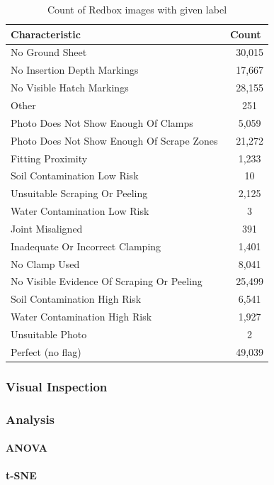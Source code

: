 \documentclass[a4paper,11pt]{article}
\begin{document}
\begin{table}[h]
   \centering
    \begin{tabular}{|l|c|}
    \hline
    Characteristic                 & Count  \\ \hline
    No Ground Sheet  & ~  30,015 \\
    No Insertion Depth Markings  & ~ 17,667 \\
    No Visible Hatch Markings  & ~ 28,155 \\
    Other  & ~  251 \\
    Photo Does Not Show Enough Of Clamps  & ~ 5,059 \\
    Photo Does Not Show Enough Of Scrape Zones  & ~ 21,272 \\
    Fitting Proximity  & ~  1,233 \\
    Soil Contamination Low Risk  & ~ 10 \\
    Unsuitable Scraping Or Peeling  & ~ 2,125 \\
    Water Contamination Low Risk  & ~ 3 \\
    Joint Misaligned  & ~  391 \\
    Inadequate Or Incorrect Clamping  & ~ 1,401 \\
    No Clamp Used  & ~  8,041 \\
    No Visible Evidence Of Scraping Or Peeling  & ~ 25,499 \\
    Soil Contamination High Risk  & ~ 6,541 \\
    Water Contamination High Risk  & ~ 1,927 \\
    Unsuitable Photo  & ~ 2 \\
     \hline
    Perfect (no flag)  & ~ 49,039 \\
    \hline
    \end{tabular}
    \caption {Count of Redbox images with given label}
\end{table} 


\subsubsection{Visual Inspection}
\subsubsection{Analysis}
\paragraph{ANOVA}
\paragraph{t-SNE}
\end{document}
